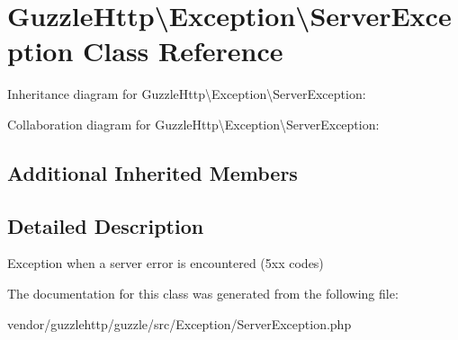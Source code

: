 \hypertarget{classGuzzleHttp_1_1Exception_1_1ServerException}{}\section{Guzzle\+Http\textbackslash{}Exception\textbackslash{}Server\+Exception Class Reference}
\label{classGuzzleHttp_1_1Exception_1_1ServerException}


Inheritance diagram for Guzzle\+Http\textbackslash{}Exception\textbackslash{}Server\+Exception\+:


Collaboration diagram for Guzzle\+Http\textbackslash{}Exception\textbackslash{}Server\+Exception\+:
\subsection*{Additional Inherited Members}


\subsection{Detailed Description}
Exception when a server error is encountered (5xx codes) 

The documentation for this class was generated from the following file\+:\begin{DoxyCompactItemize}
\item 
vendor/guzzlehttp/guzzle/src/\+Exception/Server\+Exception.\+php\end{DoxyCompactItemize}
